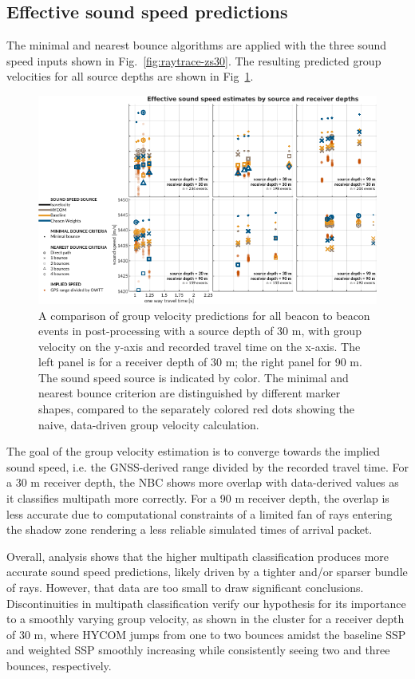 \subsection{Effective sound speed predictions}

The minimal and nearest bounce algorithms are applied with the three sound speed inputs shown in Fig.~\ref{fig:raytrace-zs30}.
The resulting predicted group velocities for all source depths are shown in Fig~\ref{fig:gvel-post}.

\begin{figure}[h!]
\includegraphics[width=\columnwidth]{figs/gvel-txrxdepth-wIso-wGPS.pdf}
\caption{A comparison of group velocity predictions for all beacon to beacon events in post-processing with a source depth of 30 m, with group velocity on the y-axis and recorded travel time on the x-axis. The left panel is for a receiver depth of 30 m; the right panel for 90 m. The sound speed source is indicated by color. The minimal and nearest bounce criterion are distinguished by different marker shapes, compared to the separately colored red dots showing the naive, data-driven group velocity calculation.}
\label{fig:gvel-post}
\end{figure}

The goal of the group velocity estimation is to converge towards the implied sound speed, i.e. the GNSS-derived range divided by the recorded travel time.
For a 30 m receiver depth, the NBC shows more overlap with data-derived values as it classifies multipath more correctly.
For a 90 m receiver depth, the overlap is less accurate due to computational constraints of a limited fan of rays entering the shadow zone rendering a less reliable simulated times of arrival packet.

Overall, analysis shows that the higher multipath classification produces more accurate sound speed predictions, likely driven by a tighter and/or sparser bundle of rays.
However, that data are too small to draw significant conclusions.
 Discontinuities in multipath classification verify our hypothesis for its importance to a smoothly varying group velocity, as shown in the cluster for a receiver depth of 30 m, where HYCOM jumps from one to two bounces amidst the baseline SSP and weighted SSP smoothly increasing while consistently seeing two and three bounces, respectively.

